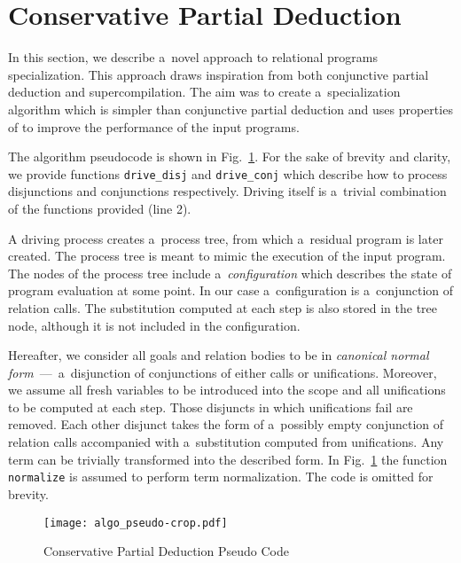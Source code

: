 \newcommand{\code}[1]{\texttt{#1}}

\section{Conservative Partial Deduction}

In this section, we describe a~novel approach to relational programs specialization.
This approach draws inspiration from both conjunctive partial deduction and supercompilation.
The aim was to create a~specialization algorithm which is simpler than conjunctive partial deduction and uses properties of \mk{} to improve the performance of the input programs.

The algorithm pseudocode is shown in Fig.~\ref{fig:ncpd-pseudo}.
For the sake of brevity and clarity, we provide functions \code{drive\_disj} and \code{drive\_conj} which describe how to process disjunctions and conjunctions respectively.
Driving itself is a~trivial combination of the functions provided (line 2).

A driving process creates a~process tree, from which a~residual program is later created.
The process tree is meant to mimic the execution of the input program.
The nodes of the process tree include a~\emph{configuration} which describes the state of program evaluation at some point.
In our case a~configuration is a~conjunction of relation calls.
The substitution computed at each step is also stored in the tree node, although it is not included in the configuration.

Hereafter, we consider all goals and relation bodies to be in \emph{canonical normal form}~---~a~disjunction of conjunctions of either calls or unifications.
Moreover, we assume all fresh variables to be introduced into the scope and all unifications to be computed at each step.
Those disjuncts in which unifications fail are removed.
Each other disjunct takes the form of a~possibly empty conjunction of relation calls accompanied with a~substitution computed from unifications.
Any \mk{} term can be trivially transformed into the described form.
In Fig.~\ref{fig:ncpd-pseudo} the function \code{normalize} is assumed to perform term normalization.
The code is omitted for brevity.

\begin{figure}[!t]
  \centering
  \texttt{[image: algo\_pseudo-crop.pdf]}
  \caption{Conservative Partial Deduction Pseudo Code}
  \label{fig:ncpd-pseudo}
\end{figure}

